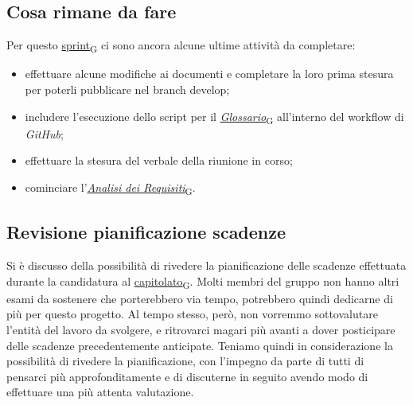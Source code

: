 \documentclass[italian,12pt]{article}
\begin{document}
\subsection{Cosa rimane da fare}
Per questo \href{https://7last.github.io/docs/rtb/documentazione-interna/glossario#sprint}{sprint\textsubscript{G}} ci sono ancora alcune ultime attività da completare:
\begin{itemize}
	\item effettuare alcune modifiche ai documenti e completare la loro prima stesura per poterli pubblicare nel branch develop;
	\item includere l'esecuzione dello script per il \href{https://7last.github.io/docs/rtb/documentazione-interna/glossario#glossario}{\textit{Glossario}\textsubscript{G}} all'interno del workflow di \textit{GitHub};
	\item effettuare la stesura del verbale della riunione in corso;
	\item cominciare l'\href{https://7last.github.io/docs/rtb/documentazione-interna/glossario#analisi-dei-requisiti}{\textit{Analisi dei Requisiti}\textsubscript{G}}.
\end{itemize}

\subsection{Revisione pianificazione scadenze}
Si è discusso della possibilità di rivedere la pianificazione delle scadenze effettuata durante la candidatura al \href{https://7last.github.io/docs/rtb/documentazione-interna/glossario#capitolato}{capitolato\textsubscript{G}}. Molti membri del gruppo non hanno altri esami da sostenere che porterebbero via tempo, potrebbero quindi dedicarne di più per questo progetto. Al tempo stesso, però, non vorremmo sottovalutare l'entità del lavoro da svolgere, e ritrovarci magari più avanti a dover posticipare delle scadenze precedentemente anticipate. Teniamo quindi in considerazione la possibilità di rivedere la pianificazione, con l'impegno da parte di tutti di pensarci più approfonditamente e di discuterne in seguito avendo modo di effettuare una più attenta valutazione.
\end{document}
